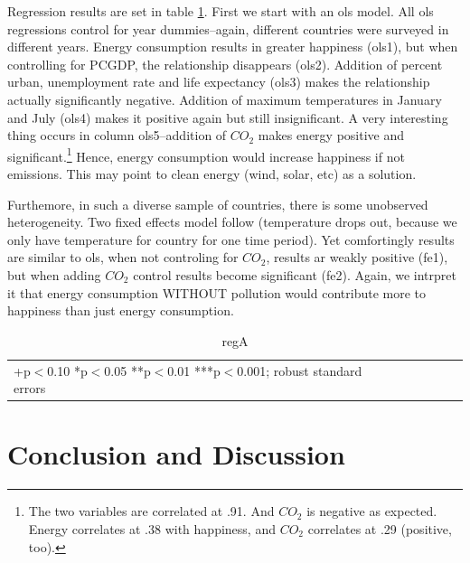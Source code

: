 \documentclass[10pt, letterpaper]{article}
\begin{document}
\begin{spacing}{1.4}
Regression results are set in table \ref{regA}. First we start with an ols
model. All ols regressions control for year dummies--again, different countries
were surveyed in different years. Energy consumption results in greater
happiness (ols1), but when controlling for PCGDP, the relationship disappears
(ols2). Addition of percent urban, unemployment rate and life expectancy (ols3)
makes the relationship actually significantly negative.  Addition of maximum
temperatures in January and July (ols4) makes it positive again but still
insignificant.  A very interesting thing occurs in column ols5--addition of
$CO_2$ makes energy positive and significant.\footnote{The two variables are
  correlated at .91. And $CO_2$ is negative as expected. Energy correlates at .38
  with happiness, and $CO_2$ correlates at .29 (positive, too).}
 Hence, energy consumption would increase happiness if not emissions. This may
 point to clean energy (wind, solar, etc) as a solution. 

Furthemore, in such a diverse sample of countries, there is some unobserved
heterogeneity. Two fixed effects model follow (temperature drops out, because we
 only have temperature for country for one time period). Yet comfortingly
 results are similar to ols, when not controling for $CO_2$, results ar weakly
 positive (fe1), but when adding $CO_2$ control results become significant
 (fe2). Again, we intrpret it  that energy consumption WITHOUT pollution would
 contribute more to happiness than just energy consumption.  

\begin{table}[H]\centering \caption{regA} \label{regA} \begin{scriptsize} \begin{tabular}{p{1.4in}p{.43in}p{.43in}p{.43in}p{.43in}p{.43in}p{.43in}p{.43in}p{.43in}p{.43in}p{.43 in}p{.43in}p{.43 in}}\hline  \hline\multicolumn{6}{l}{+p$<$0.10 *p$<$0.05 **p$<$0.01 ***p$<$0.001; robust standard errors} \end{tabular}\end{scriptsize}\end{table}
 

\section{Conclusion and Discussion}



\end{spacing}
\end{document}
